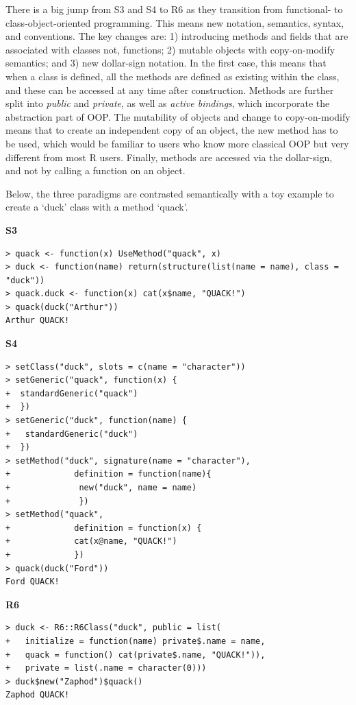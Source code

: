 There is a big jump from S3 and S4 to R6 as they transition from functional- to class-object-oriented programming. This means new notation, semantics, syntax, and conventions. The key changes are: 1) introducing methods and fields that are associated with classes not, functions; 2) mutable objects with copy-on-modify semantics; and 3) new dollar-sign notation. In the first case, this means that when a class is defined, all the methods are defined as existing within the class, and these can be accessed at any time after construction. Methods are further split into \textit{public} and \textit{private}, as well as \textit{active bindings}, which incorporate the abstraction part of OOP. The mutability of objects and change to copy-on-modify means that to create an independent copy of an object, the new method  has to be used, which would be familiar to users who know more classical OOP but very different from most R users. Finally, methods are accessed via the dollar-sign, and not by calling a function on an object.

Below, the three paradigms are contrasted semantically with a toy example to create a `duck' class with a method `quack'.

\begin{center}
\textbf{S3}
\end{center}
\begin{verbatim}
> quack <- function(x) UseMethod("quack", x)
> duck <- function(name) return(structure(list(name = name), class = "duck"))
> quack.duck <- function(x) cat(x$name, "QUACK!")
> quack(duck("Arthur"))
Arthur QUACK!
\end{verbatim}

\begin{center}
\textbf{S4}
\end{center}
\begin{verbatim}
> setClass("duck", slots = c(name = "character"))
> setGeneric("quack", function(x) {
+  standardGeneric("quack")
+  })
> setGeneric("duck", function(name) {
+   standardGeneric("duck")
+  })
> setMethod("duck", signature(name = "character"),
+             definition = function(name){
+              new("duck", name = name)
+              })
> setMethod("quack",
+             definition = function(x) {
+             cat(x@name, "QUACK!")
+             })
> quack(duck("Ford"))
Ford QUACK!
\end{verbatim}
\begin{center}
\textbf{R6}
\end{center}
\begin{verbatim}
> duck <- R6::R6Class("duck", public = list(
+   initialize = function(name) private$.name = name,
+   quack = function() cat(private$.name, "QUACK!")),
+   private = list(.name = character(0)))
> duck$new("Zaphod")$quack()
Zaphod QUACK!
\end{verbatim}

